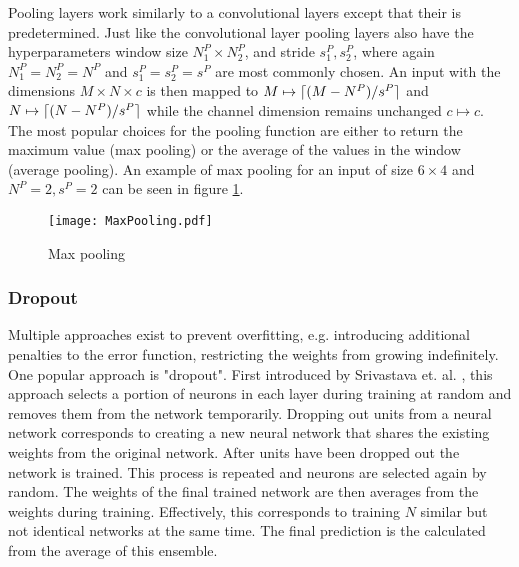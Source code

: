 
Pooling layers work similarly to a convolutional layers except that their is predetermined. Just like the convolutional layer pooling layers also have the hyperparameters window size $N^P_1 \times N^P_2$, and stride $s_1^P,s_2^P$, where again $N^P_1 = N^P_2 = N^P$ and $s_1^P=s_2^P=s^P$ are most commonly chosen. An input with the  dimensions $M \times N \times c$ is then mapped to  $M \mapsto \lceil(M-N^P)/s^P\rceil $ and $N \mapsto \lceil(N-N^P)/s^P\rceil$ while the channel dimension remains unchanged $c \mapsto c$.\\

The most popular choices for the pooling function are either to return the maximum value (max pooling) or the average of the values in the window (average pooling). An example of max pooling for an input of size $6\times 4$ and $N^P = 2, s^P = 2$  can be seen in figure \ref{fig:MaxPooling}.\\

\begin{figure}[H]
\centering
\texttt{[image: MaxPooling.pdf]}
\caption{Max pooling}
\label{fig:MaxPooling}
\end{figure}


\subsubsection{Dropout}
Multiple approaches exist to prevent overfitting, e.g. introducing additional penalties to the error function, restricting the weights from growing indefinitely. One popular approach is "dropout". First introduced by Srivastava et. al. \cite{DropoutOriginal}, this approach selects a portion of neurons in each layer during training at random and removes them from the network temporarily. Dropping out units from a neural network corresponds to creating a new neural network that shares the existing weights from the original network. After units have been dropped out the network is trained. This process is repeated and neurons are selected again by random. The weights of the final trained network are then averages from the weights during training. Effectively, this corresponds to training $N$ similar but not identical networks at the same time. The final prediction is the calculated from the average of this ensemble. \\ %

